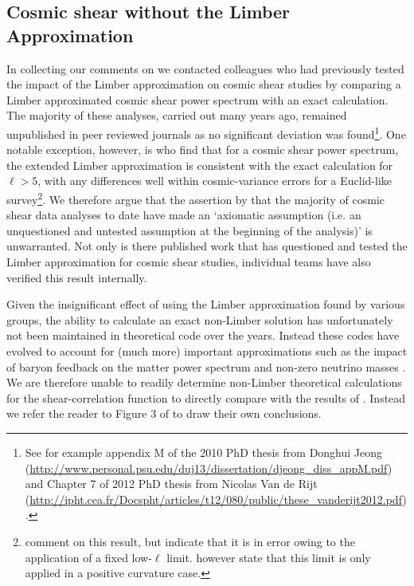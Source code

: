  \subsection{Cosmic shear without the Limber Approximation}
In collecting our comments on \citet{kitching/etal:2016} we contacted colleagues who had previously tested the impact of the Limber approximation on cosmic shear studies by comparing a Limber approximated cosmic shear power spectrum with an exact calculation.  The majority of these analyses, carried out many years ago, remained unpublished in peer reviewed journals as no significant deviation was found\footnote{See for example appendix M of the 2010 PhD thesis from Donghui Jeong (\url{http://www.personal.psu.edu/duj13/dissertation/djeong_diss_appM.pdf}) and Chapter 7 of 2012 PhD thesis from Nicolas Van de Rijt (\url{http://ipht.cea.fr/Docspht/articles/t12/080/public/these_vanderijt2012.pdf}).}.  One notable exception, however, is \citet{giannantonio/etal:2012} who find that for a cosmic shear power spectrum, the extended Limber approximation is consistent with the exact calculation for $\ell>5$, with any differences well within cosmic-variance errors for a Euclid-like survey\footnote{\citet{kitching/etal:2016} comment on this result, but indicate that it is in error owing to the application of a fixed low-$\ell$ limit.  \citet{giannantonio/etal:2012} however state that this limit is only applied in a positive curvature case.}.  We therefore argue that the assertion by \citet{kitching/etal:2016} that the majority of cosmic shear data analyses to date have made an `axiomatic assumption (i.e. an unquestioned and untested assumption at the beginning of the analysis)'  is unwarranted.  Not only is there published work that has questioned and tested the Limber approximation for cosmic shear studies, individual teams have also verified this result internally.    

Given the insignificant effect of using the Limber approximation found by various groups, the ability to calculate an exact non-Limber solution has unfortunately not been maintained in theoretical code over the years.  Instead these codes have evolved to account for (much more) important approximations such as the impact of baryon feedback on the matter power spectrum and non-zero neutrino masses \citep[see for example][]{joudaki/etal:2016, mead/etal:2016}.    We are therefore unable to readily determine non-Limber theoretical calculations for the shear-correlation function to directly compare with the results of \citet{kitching/etal:2016}.   Instead we refer the reader to Figure 3 of \citet{giannantonio/etal:2012} to draw their own conclusions.



 
 
 
 
 
 
 